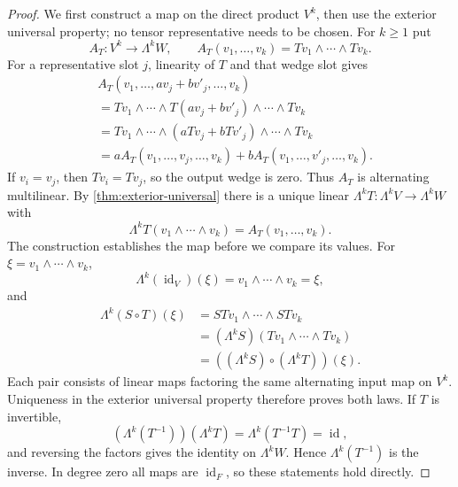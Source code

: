 \begin{proof}
We first construct a map on the direct product $V^k$, then use the
exterior universal property; no tensor representative needs to be chosen.
For $k\geq1$ put
\[
A_T:V^k\to\Lambda^kW,\qquad
A_T(v_1,\ldots,v_k)=Tv_1\wedge\cdots\wedge Tv_k.
\]
For a representative slot $j$, linearity of $T$ and that wedge slot gives
\[
\begin{aligned}
&A_T(v_1,\ldots,av_j+bv'_j,\ldots,v_k)\\
&=Tv_1\wedge\cdots\wedge T(av_j+bv'_j)\wedge\cdots\wedge Tv_k\\
&=Tv_1\wedge\cdots\wedge(aTv_j+bTv'_j)\wedge\cdots\wedge Tv_k\\
&=aA_T(v_1,\ldots,v_j,\ldots,v_k)
+bA_T(v_1,\ldots,v'_j,\ldots,v_k).
\end{aligned}
\]
If $v_i=v_j$, then $Tv_i=Tv_j$, so the output wedge is zero.
Thus $A_T$ is alternating multilinear. By \cref{thm:exterior-universal}
there is a unique linear $\Lambda^kT:\Lambda^kV\to\Lambda^kW$ with
\[
\Lambda^kT(v_1\wedge\cdots\wedge v_k)=A_T(v_1,\ldots,v_k).
\]
The construction establishes the map before we compare its values.
For $\xi=v_1\wedge\cdots\wedge v_k$,
\[
\Lambda^k(\operatorname{id}_V)(\xi)=v_1\wedge\cdots\wedge v_k=\xi,
\]
and
\[
\begin{aligned}
\Lambda^k(S\circ T)(\xi)
&=STv_1\wedge\cdots\wedge STv_k\\
&=(\Lambda^kS)(Tv_1\wedge\cdots\wedge Tv_k)\\
&=((\Lambda^kS)\circ(\Lambda^kT))(\xi).
\end{aligned}
\]
Each pair consists of linear maps factoring the same alternating input
map on $V^k$. Uniqueness in the exterior universal property therefore
proves both laws. If $T$ is invertible,
\[
(\Lambda^k(T^{-1}))(\Lambda^kT)=\Lambda^k(T^{-1}T)=\operatorname{id},
\]
and reversing the factors gives the identity on $\Lambda^kW$.
Hence $\Lambda^k(T^{-1})$ is the inverse. In degree zero all maps are
$\operatorname{id}_F$, so these statements hold directly.
\end{proof}

